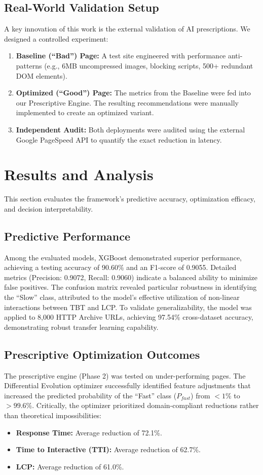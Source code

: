 \documentclass[conference]{IEEEtran}
\begin{document}
\subsection{Real-World Validation Setup}
A key innovation of this work is the external validation of AI prescriptions. We designed a controlled experiment:
\begin{enumerate}
    \item \textbf{Baseline (``Bad'') Page:} A test site engineered with performance anti-patterns (e.g., 6MB uncompressed images, blocking scripts, 500+ redundant DOM elements).
    \item \textbf{Optimized (``Good'') Page:} The metrics from the Baseline were fed into our Prescriptive Engine. The resulting recommendations were manually implemented to create an optimized variant.
    \item \textbf{Independent Audit:} Both deployments were audited using the external Google PageSpeed API to quantify the exact reduction in latency.
\end{enumerate}

\section{Results and Analysis}

This section evaluates the framework's predictive accuracy, optimization efficacy, and decision interpretability.

\subsection{Predictive Performance}
Among the evaluated models, XGBoost demonstrated superior performance, achieving a testing accuracy of 90.60\% and an F1-score of 0.9055. Detailed metrics (Precision: 0.9072, Recall: 0.9060) indicate a balanced ability to minimize false positives. The confusion matrix revealed particular robustness in identifying the ``Slow'' class, attributed to the model's effective utilization of non-linear interactions between TBT and LCP. To validate generalizability, the model was applied to 8,000 HTTP Archive URLs, achieving 97.54\% cross-dataset accuracy, demonstrating robust transfer learning capability.

\subsection{Prescriptive Optimization Outcomes}
The prescriptive engine (Phase 2) was tested on under-performing pages. The Differential Evolution optimizer successfully identified feature adjustments that increased the predicted probability of the ``Fast'' class ($P_{fast}$) from $<1\%$ to $>99.6\%$.
Critically, the optimizer prioritized domain-compliant reductions rather than theoretical impossibilities:
\begin{itemize}
    \item \textbf{Response Time:} Average reduction of 72.1\%.
    \item \textbf{Time to Interactive (TTI):} Average reduction of 62.7\%.
    \item \textbf{LCP:} Average reduction of 61.0\%.
\end{itemize}
\end{document}
